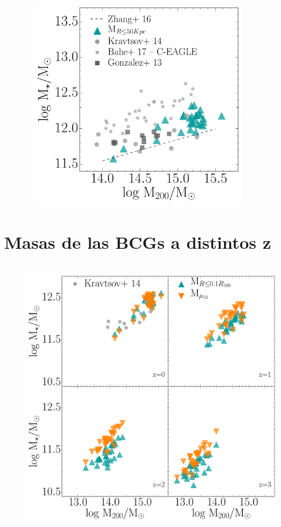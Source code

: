 \begin{figure}[H]
 \centering
 \includegraphics[height=9cm, width=10cm]{../al_final/LR/evolucion/relaciones/M502D_vs_M200.pdf}
\end{figure}



\section{Masas de las BCGs a distintos z}
\label{sec:zeta0}



\begin{figure}[H]
\centering
\hspace*{-1.5cm}
 \includegraphics[height=12cm, width=13cm]{../al_final/LR/evolucion/relaciones/muvs10r.pdf}
\end{figure}


